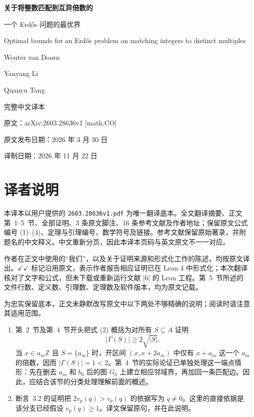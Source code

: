 \documentclass[UTF8,a4paper,oneside,openany,fontset=fandol,zihao=-4]{ctexbook}
\theoremstyle{chinesestyle}
\newcommand{\leanmark}{\ensuremath{\checkmark\!\checkmark}}
\begin{document}
\begin{titlepage}
\centering
\vspace*{20mm}
{\bfseries 关于将整数匹配到互异倍数的\par
一个 Erd\H{o}s 问题的最优界\par}
\vspace{12mm}
{\Large Optimal bounds for an Erd\H{o}s problem on matching integers to distinct multiples\par}
\vspace{15mm}
{\large Wouter van Doorn\par Yanyang Li\par Quanyu Tang\par}
\vspace{16mm}
{\Large 完整中文译本\par}
\vspace{7mm}
{\large 原文：arXiv:2603.28636v1 [math.CO]\par}
\vspace{3mm}
{\large 原文发布日期：2026 年 3 月 30 日\par}
\vfill
{译制日期：2026 年 11 月 22 日\par}
\end{titlepage}

\frontmatter
\chapter*{译者说明}

本译本以用户提供的 \texttt{2603.28636v1.pdf} 为唯一翻译底本。全文翻译摘要、正文第~1--5~节、全部证明、3 条原文脚注、16 条参考文献及作者地址；保留原文公式编号 (1)--(4)、定理与引理编号、数学符号及链接。参考文献保留原始著录，并附题名的中文释义。中文重新分页，因此本译本页码与英文原文不一一对应。

作者在正文中使用的“我们”，以及关于证明来源和形式化工作的陈述，均按原文译出。\leanmark{} 标记沿用原文，表示作者报告相应证明已在 Lean 4 中形式化；本次翻译核对了文字和公式，但未下载或重新运行文献 [6] 的 Lean 工程。第~5~节所述的文件行数、定义数、引理数、定理数及软件版本，均为原文记载。

为忠实保留底本，正文未静默改写原文中以下两处不够精确的说明；阅读时请注意其适用范围。

\begin{enumerate}[label=\arabic*.,leftmargin=2em,itemsep=0.65em]
\item 第~2~节及第~4~节开头把式 (2) 概括为对所有 $S\subseteq A$ 证明
\[
|\Gamma(S)|\geq2\sqrt{|S|}.
\]
当 $x\in a_m\mathbb Z$ 且 $S=\{a_m\}$ 时，开区间 $(x,x+2a_m)$ 中仅有 $x+a_m$ 这一个 $a_m$ 的倍数，因而 $|\Gamma(S)|=1<2$。第~4~节的实际论证已单独处理这一端点情形：先在删去 $a_m$ 和 $b_0$ 后的图 $G_0$ 上建立相应邻域界，再加回一条匹配边。因此，应结合该节的分类处理理解前面的概述。
\item 断言~3.2 的证明把 $2v_p(q)>v_p(q)$ 的依据写为 $q\ne0$。这里的直接依据是该分支已经假设 $v_p(q)\geq1$。译文保留原句，并在此说明。
\end{enumerate}
\end{document}
